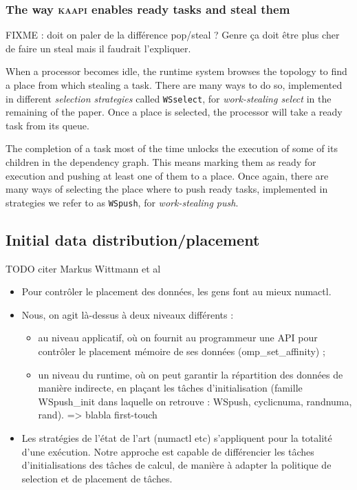 \documentclass{Styles/llncs}
\newcommand{\kaapi}{\textsc{\mbox{kaapi}}\xspace}
\begin{document}
\subsubsection{The way \kaapi enables ready tasks and steal them}
FIXME : doit on paler de la différence pop/steal ? Genre ça doit être plus cher de
faire un steal mais il faudrait l'expliquer.

When a processor becomes idle, the runtime system browses the topology to find a place from which stealing a task.
There are many ways to do so, implemented in different \emph{selection strategies} called \verb/WSselect/, for \emph{work-stealing select} in the remaining of the paper.
Once a place is selected, the processor will take a ready task from its queue.

The completion of a task most of the time unlocks the execution of some of its children in the dependency graph.
This means marking them as ready for execution and pushing at least one of them to a place.
Once again, there are many ways of selecting the place where to push ready tasks, implemented in strategies we refer to as \verb/WSpush/, for \emph{work-stealing push}.


\subsection{Initial data distribution/placement}
TODO citer Markus Wittmann et al ~\cite{DBLP:journals/corr/abs-1101-0093}
\begin{itemize}
  \item Pour contrôler le placement des données, les gens font au
    mieux numactl.
  \item Nous, on agit là-dessus à deux niveaux différents :
    \begin{itemize}
      \item au niveau applicatif, où on fournit au programmeur une API
        pour contrôler le placement mémoire de ses données
        (omp\_set\_affinity) ;
      \item un niveau du runtime, où on peut garantir la
        répartition des données de manière indirecte, en plaçant les
        tâches d'initialisation (famille WSpush\_init dans laquelle on
        retrouve : WSpush, cyclicnuma, randnuma, rand). => blabla first-touch
      \end{itemize}
    \item Les stratégies de l'état de l'art (numactl etc) s'appliquent
      pour la totalité d'une exécution. Notre approche est capable de
      différencier les tâches d'initialisations des tâches de calcul,
      de manière à adapter la politique de selection et de placement
      de tâches.
\end{itemize}
\end{document}
